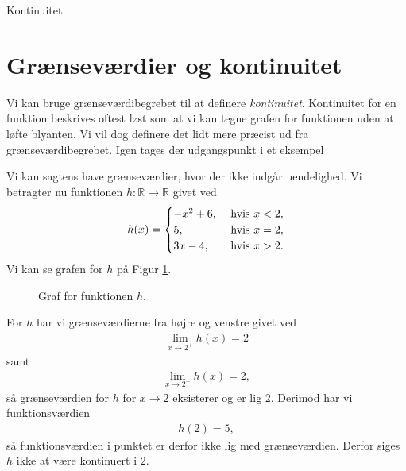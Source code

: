 \begin{center}
	\Huge
	Kontinuitet
\end{center}


\section*{Grænseværdier og kontinuitet}

Vi kan bruge grænseværdibegrebet til at definere \textit{kontinuitet}. Kontinuitet for en funktion beskrives oftest løst som at vi kan tegne grafen for funktionen uden at løfte blyanten. Vi vil dog definere det lidt mere præcist ud fra grænseværdibegrebet. Igen tages der udgangspunkt i et eksempel

\begin{exa}
	Vi kan sagtens have grænseværdier, hvor der ikke indgår uendelighed. Vi betragter nu funktionen 
	$h:\mathbb{R} \to \mathbb{R}$ givet ved
	\begin{align*}
		h(x) = 
		\begin{cases}
		-x^2 + 6, \ &\textnormal{hvis } x < 2, \\
		5, &\textnormal{hvis } x = 2, \\
		3x - 4, &\textnormal{hvis } x > 2. 
		\end{cases}
	\end{align*}
	Vi kan se grafen for $h$ på Figur \ref{fig:grænse3}.
	\begin{figure}[H]
	\centering
	\caption{Graf for funktionen $h$.}
	\label{fig:grænse3}
	\end{figure}
	For $h$ har vi grænseværdierne fra højre og venstre givet ved 
	\begin{align*}
		\lim_{x \to 2^+} h(x) = 2
	\end{align*}
	samt 
	\begin{align*}
		\lim_{x \to 2^-}h(x) = 2,
	\end{align*}
	så grænseværdien for $h$ for $x \to 2$ eksisterer og er lig $2$. Derimod har vi funktionsværdien 
	\begin{align*}
		h(2) = 5, 
	\end{align*}
	så funktionsværdien i punktet er derfor ikke lig med grænseværdien. Derfor siges $h$ ikke at være 
	kontinuert i $2$. 
\end{exa}

